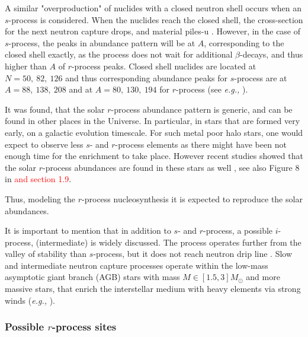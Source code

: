 \documentclass[11pt,a4paper,headinclude=true,DIV=14,BCOR=8mm,chapterprefix,listof=totoc,twoside,openright,abstracton]{scrbook}
\begin{document}
A similar "overproduction" of nuclides with a closed neutron shell occurs when an $s$-process is considered. When the nuclides reach the closed shell, the cross-section for the next neutron capture drops, and material piles-u \cite{Rolfs:1988}. 
However, in the case of $s$-process, the peaks in abundance pattern will be at $A$, corresponding to the closed shell exactly, as the process does not wait for additional $\beta$-decays, and thus higher than $A$ of $r$-process peaks. 
Closed shell nuclides are located at $N=50,\: 82, \: 126$ and thus corresponding abundance peaks for $s$-process are at $A=88, \: 138, \: 208$ and at $A=80,\:130,\:194$ for $r$-process (see \textit{e.g.,} \cite{Arnould:2007gh}).

It was found, that the solar $r$-process abundance pattern is generic, and can be found in other places in the Universe. In particular, in stars that are formed very early, on a galactic evolution timescale. For such metal poor halo stars, one would expect to observe less $s$- and $r$-process elements as there might have been not enough time for the enrichment to take place. However recent studies showed that the solar $r$-process abundances are found in these stars as well \cite{Sneden:2008,Roederer:2010}, see also Figure 8 in \cite{Sneden:2009} 
\textcolor{red}{and section 1.9}. 

Thus, modeling the $r$-process nucleosynthesis it is expected to reproduce the solar abundances. 

It is important to mention that in addition to $s$- and $r$-process, a possible $i$-process, (intermediate) is widely discussed. 
The process operates further from the valley of stability than $s$-process, but it does not reach neutron drip line \cite{Cowan:1977,Bertolli:2013gka}. 
Slow and intermediate neutron capture processes operate within the low-mass asymptotic giant branch (AGB) stars with mass $M\in[1.5,3]M_{\odot}$ and more massive stars, that enrich the interstellar medium with heavy elements via strong winds (\textit{e.g.,} \cite{Peters:1968,Couch:1974,Kaeppeler:1994K,Woosley:2002,Straniero:2005hc,Herwig:2011}). 


\subsubsection{Possible $r$-process sites}



\newpage


\end{document}
